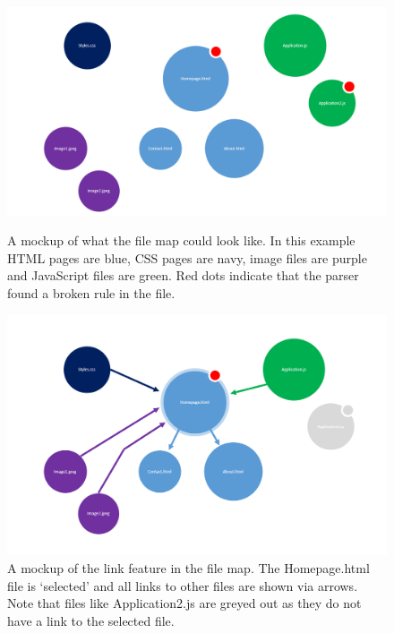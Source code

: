 \documentclass[letterpaper,10pt,titlepage,draftclsnofoot,onecolumn,onesided] {IEEEtran}
\begin{document}
\begin{figure}
\centering
\includegraphics[scale=0.25]{filemap.png}
\caption{A mockup of what the file map could look like. 
In this example HTML pages are blue, CSS pages are navy, image files are purple and JavaScript files are green.
Red dots indicate that the parser found a broken rule in the file.}

\includegraphics[scale=0.25]{links.png}
\caption{A mockup of the link feature in the file map.
The Homepage.html file is `selected' and all links to other files are shown via arrows.
Note that files like Application2.js are greyed out as they do not have a link to the selected file.}

\pagebreak


\end{figure}
\end{document}
